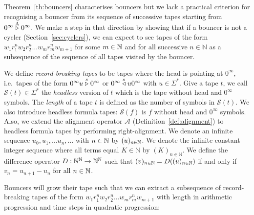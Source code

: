 Theorem~\ref{th:bouncers} characterises bouncers but we lack a practical criterion for recognising a bouncer from its sequence of successive tapes starting from $0^\infty \stackrel{\text{A}}\triangleright 0^\infty$. We make a step in that direction by showing that if a bouncer is not a cycler (Section~\ref{sec:cyclers}), we can expect to see tapes of the form $w_1 r_1^n w_2 r_2^n \dots w_m r_m^n w_{m+1}$ for some $m\in\mathbb{N}$ and for all successive $n\in\mathbb{N}$ as a subsequence of the sequence of all tapes visited by the bouncer.

We define \textit{record-breaking tapes} to be tapes where the head is pointing at $0^\infty$, i.e.\ tapes of the form $0^\infty u \stackrel{s}\triangleright 0^\infty$ or $0^\infty \stackrel{s}\triangleleft u 0^\infty$ with $u\in\Sigma^*$. Give a tape $t$, we call $\mathcal{S}(t) \in \Sigma^*$ the \textit{headless} version of $t$ which is the tape without head and $0^\infty$ symbols. The \textit{length} of a tape $t$ is defined as the number of symbols in $\mathcal{S}(t)$. We also introduce headless formula tapes: $\mathcal{S}(f)$ is $f$ without head and $0^\infty$ symbols. Also, we extend the alignment operator $\mathcal{A}$ (Definition~\ref{def:alignment}) to headless formula tapes by performing right-alignment. We denote an infinite sequence $u_0, u_1, \dots u_n, \dots$ with $n\in\mathbb{N}$ by $(u)_{n\in\mathbb{N}}$. We denote the infinite constant integer sequence where all terms equal $K\in\mathbb{N}$ by $(K)_{n\in\mathbb{N}}$. We define the difference operator $D: \mathbb{N}^{\mathbb{N}} \to \mathbb{N}^{\mathbb{N}}$ such that $(v)_{n\in\mathbb{N}} = D((u)_{n\in\mathbb{N}})$ if and only if $v_n = u_{n+1}-u_{n}$ for all $n\in\mathbb{N}$.

Bouncers will grow their tape such that we can extract a subsequence of record-breaking tapes of the form $w_1 r_1^n w_2 r_2^n \dots w_m r_m^n w_{m+1}$ with length in arithmetic progression and time steps in quadratic progression:

